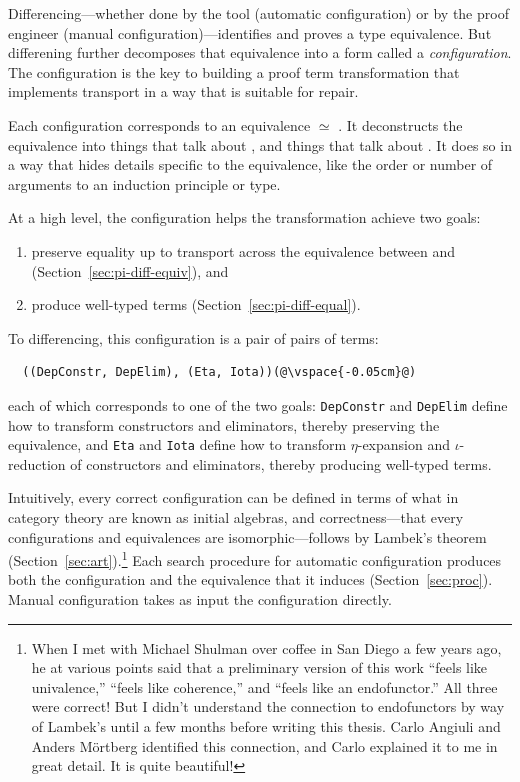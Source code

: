 Differencing---whether done by the tool (automatic configuration) or by the proof engineer (manual configuration)---identifies 
and proves a type equivalence. But differening further decomposes that equivalence into a form called a \textit{configuration}. 
The configuration is the key to building a proof term transformation that implements transport in a way that is suitable for repair.

Each configuration corresponds to an equivalence \Aa $\simeq$ \B.
It deconstructs the equivalence into things that talk about \Aa, and things that talk about \B.
It does so in a way that hides details
specific to the equivalence, like the order or number of arguments to an induction principle or type.

At a high level, the configuration helps the transformation achieve two goals: 

\begin{enumerate}
\item preserve equality up to transport across the equivalence between \Aa and \B (Section~\ref{sec:pi-diff-equiv}), and 
\item produce well-typed terms (Section~\ref{sec:pi-diff-equal}).
\end{enumerate}
To differencing, this configuration is a pair of pairs of terms:

\begin{lstlisting}
  ((DepConstr, DepElim), (Eta, Iota))(@\vspace{-0.05cm}@)
\end{lstlisting}
each of which corresponds to one of the two goals:
\lstinline{DepConstr} and \lstinline{DepElim} define how to transform constructors and eliminators, thereby preserving the equivalence, and 
\lstinline{Eta} and \lstinline{Iota} define how to transform $\eta$-expansion and $\iota$-reduction of constructors and eliminators, thereby producing well-typed terms.

Intuitively, every correct configuration can be defined in terms of what in category theory are known as initial algebras,
and correctness---that every configurations and equivalences are isomorphic---follows by Lambek's theorem (Section~\ref{sec:art}).\footnote{When I met with Michael Shulman over coffee in San Diego a few years ago, he at various points said that a preliminary version of this work ``feels like univalence,'' ``feels like coherence,'' and ``feels like an endofunctor.'' All three were correct! But I didn't understand the connection to endofunctors by way of Lambek's until a few months before writing this thesis.
Carlo Angiuli and Anders M\"{o}rtberg identified this connection, and Carlo explained it to me in great detail.
It is quite beautiful!}  %
Each search procedure for automatic configuration produces both the configuration and the equivalence that it induces (Section~\ref{sec:proc}).
Manual configuration takes as input the configuration directly.

